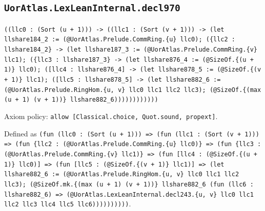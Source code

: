 \documentclass[11pt]{article}
\begin{document}
\subsection*{\texttt{UorAtlas.LexLeanInternal.decl970}}
\noindent\texttt{((llc0 : (Sort (u + 1))) -> ((llc1 : (Sort (v + 1))) -> (let llshare184\_2 := (@UorAtlas.Prelude.CommRing.\{u\} llc0); (\{llc2 : llshare184\_2\} -> (let llshare187\_3 := (@UorAtlas.Prelude.CommRing.\{v\} llc1); (\{llc3 : llshare187\_3\} -> (let llshare876\_4 := (@SizeOf.\{(u + 1)\} llc0); ([llc4 : llshare876\_4] -> (let llshare878\_5 := (@SizeOf.\{(v + 1)\} llc1); ([llc5 : llshare878\_5] -> (let llshare882\_6 := (@UorAtlas.Prelude.RingHom.\{u, v\} llc0 llc1 llc2 llc3); (@SizeOf.\{(max (u + 1) (v + 1))\} llshare882\_6))))))))))))}\par
\noindent Axiom policy: \texttt{allow [Classical.choice, Quot.sound, propext]}.\par
\noindent Defined as \texttt{(fun (llc0 : (Sort (u + 1))) => (fun (llc1 : (Sort (v + 1))) => (fun \{llc2 : (@UorAtlas.Prelude.CommRing.\{u\} llc0)\} => (fun \{llc3 : (@UorAtlas.Prelude.CommRing.\{v\} llc1)\} => (fun [llc4 : (@SizeOf.\{(u + 1)\} llc0)] => (fun [llc5 : (@SizeOf.\{(v + 1)\} llc1)] => (let llshare882\_6 := (@UorAtlas.Prelude.RingHom.\{u, v\} llc0 llc1 llc2 llc3); (@SizeOf.mk.\{(max (u + 1) (v + 1))\} llshare882\_6 (fun (llc6 : llshare882\_6) => (@UorAtlas.LexLeanInternal.decl243.\{u, v\} llc0 llc1 llc2 llc3 llc4 llc5 llc6))))))))))}.\par
\end{document}
